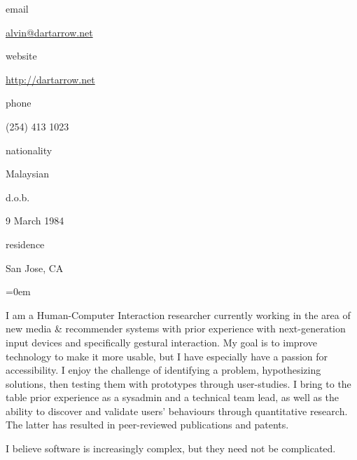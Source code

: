 \documentclass[a4paper]{scrartcl}
\newcommand{\Columize}[2]{\noindent \parbox{2cm}{{#1}} {#2} } %
\newcommand{\Description}[1]{\hangindent=0em\hangafter=0\noindent\footnotesize{#1}\par\normalsize\vspace{1em}} %
\newcommand{\Redvline}[0]{\vspace{0.5em}\noindent{\color{ThemeColor}\rule{16cm}{0.4pt}}}
\newcommand{\MyName}[1]{\noindent{\textsc{\LARGE{\color{ThemeColor}#1}}}} %
\newcommand{\BlockTitle}[1]{\textsc{\vspace{0.15em}}\noindent{\spacedlowsmallcaps{#1}}\vspace{1em}}
\begin{document}
\thispagestyle{empty} %


\MyName{Alvin Jude} %

\vspace{-0.3em}

\Redvline

\begin{multicols}{2}
\Columize{email}{\href{mailto:alvin@dartarrow.net}{alvin@dartarrow.net}} %

\Columize{website}{\href{http://dartarrow.net}{http://dartarrow.net}} %

\Columize{phone}{(254) 413 1023 } %

\columnbreak

\Columize{nationality}{Malaysian}

\Columize{d.o.b.}{9 March 1984}

\Columize{residence}{San Jose, CA}




\end{multicols}

\vspace{1em} %


\Description{I am a Human-Computer Interaction researcher currently working in the area of new media \& recommender systems with prior experience with next-generation input devices and specifically gestural interaction.
My goal is to improve technology to make it more usable, but I have especially have a passion for accessibility.
I enjoy the challenge of identifying a problem, hypothesizing solutions, then testing them with prototypes through user-studies.
I bring to the table prior experience as a sysadmin and a technical team lead, as well as the ability to discover and validate users' behaviours through quantitative research.
The latter has resulted in peer-reviewed publications and patents.

I believe software is increasingly complex, but they need not be complicated.
}

\Redvline
\end{document}
